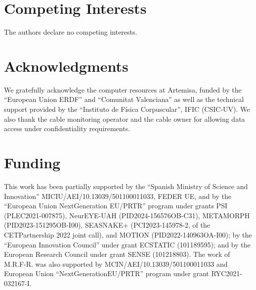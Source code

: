\documentclass[11pt]{article}
\begin{document}
\section*{Competing Interests}
\label{sec:competing interests}

The authors declare no competing interests.

\section*{Acknowledgments}
\label{sec:acknowledgements}

We gratefully acknowledge the computer resources at Artemisa, funded by the ``European Union ERDF'' and ``Comunitat Valenciana'' as well as the technical support provided by the ``Instituto de Física Corpuscular'', IFIC (CSIC-UV). We also thank the cable monitoring operator and the cable owner for allowing data access under confidentiality requirements.


\section*{Funding}
\label{sec:funding}

This work has been partially supported by the ``Spanish Ministry of Science and Innovation'' MICIU/AEI/10.13039/501100011033, FEDER UE, and by the ``European Union NextGeneration EU/PRTR'' program under grants PSI (PLEC2021-007875), NeurEYE-UAH (PID2024-156576OB-C31), METAMORPH (PID2023-151295OB-I00), SEASNAKE+ (PCI2023-145978-2, of the CETPartnership 2022 joint call), and MOTION (PID2022-140963OA-I00); by the ``European Innovation Council'' under grant ECSTATIC (101189595);  and by the European Research Council under grant SENSE (101218803). The work of M.R.F-R. was also supported by MCIN/AEI/10.13039/501100011033 and European Union ``NextGenerationEU/PRTR'' program under grant RYC2021-032167-I.


\end{document}
